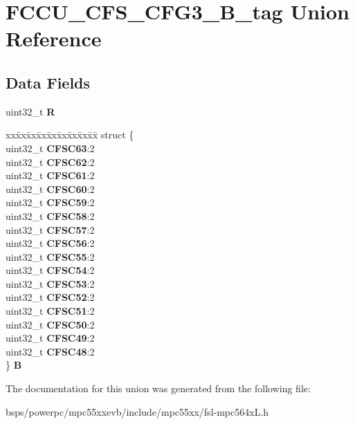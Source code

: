 \hypertarget{unionFCCU__CFS__CFG3__32B__tag}{}\section{F\+C\+C\+U\+\_\+\+C\+F\+S\+\_\+\+C\+F\+G3\+\_\+B\+\_\+tag Union Reference}
\label{unionFCCU__CFS__CFG3__32B__tag}
\subsection*{Data Fields}
\begin{DoxyCompactItemize}
\item 
\mbox{\label{unionFCCU__CFS__CFG3__32B__tag_a2b2025bea6cde90711d2dc1997867e8a}} 
uint32\+\_\+t {\bfseries R}
\item 
\mbox{\label{unionFCCU__CFS__CFG3__32B__tag_ae1ac2bcd13465f6fd62e532c845b99d2}} 
\begin{tabbing}
xx\=xx\=xx\=xx\=xx\=xx\=xx\=xx\=xx\=\kill
struct \{\\
\>uint32\_t {\bfseries CFSC63}:2\\
\>uint32\_t {\bfseries CFSC62}:2\\
\>uint32\_t {\bfseries CFSC61}:2\\
\>uint32\_t {\bfseries CFSC60}:2\\
\>uint32\_t {\bfseries CFSC59}:2\\
\>uint32\_t {\bfseries CFSC58}:2\\
\>uint32\_t {\bfseries CFSC57}:2\\
\>uint32\_t {\bfseries CFSC56}:2\\
\>uint32\_t {\bfseries CFSC55}:2\\
\>uint32\_t {\bfseries CFSC54}:2\\
\>uint32\_t {\bfseries CFSC53}:2\\
\>uint32\_t {\bfseries CFSC52}:2\\
\>uint32\_t {\bfseries CFSC51}:2\\
\>uint32\_t {\bfseries CFSC50}:2\\
\>uint32\_t {\bfseries CFSC49}:2\\
\>uint32\_t {\bfseries CFSC48}:2\\
\} {\bfseries B}\\

\end{tabbing}\end{DoxyCompactItemize}


The documentation for this union was generated from the following file\+:\begin{DoxyCompactItemize}
\item 
bsps/powerpc/mpc55xxevb/include/mpc55xx/fsl-\/mpc564x\+L.\+h\end{DoxyCompactItemize}
